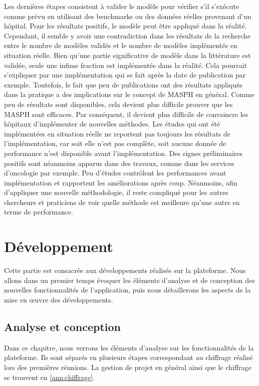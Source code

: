 \documentclass[noposter]{polytech/polytech}
\begin{document}
Les dernières étapes consistent à valider le modèle pour vérifier s'il s'exécute comme prévu en utilisant des benchmarks ou des données réelles provenant d'un hôpital. Pour les résultats positifs, le modèle peut être appliqué dans la réalité. Cependant, il semble y avoir une contradiction dans les résultats de la recherche entre le nombre de modèles validés et le nombre de modèles implémentés en situation réelle. Bien qu'une partie significative de modèle dans la littérature est validée, seule une infime fraction est implémentée dans la réalité. Cela pourrait s'expliquer par une implémentation qui se fait après la date de publication par exemple. Toutefois, le fait que peu de publications ont des résultats appliqués dans la pratique a des implications sur le concept de MASPH en général. Comme peu de résultats sont disponibles, cela devient plus difficile prouver que les MASPH sont efficaces. Par conséquent, il devient plus difficile de convaincre les hôpitaux d'implémenter de nouvelles méthodes. Les études qui ont été implémentées en situation réelle ne reportent pas toujours les résultats de l'implémentation, car soit elle n'est pas complète, soit aucune donnée de performance n'est disponible avant l'implémentation. Des signes préliminaires positifs sont néanmoins apparus dans des travaux, comme dans les services d'oncologie par exemple. Peu d'études contrôlent les performances avant implémentation et rapportent les améliorations après coup. Néanmoins, afin d'appliquer une nouvelle méthodologie, il reste compliqué pour les autres chercheurs et praticiens de voir quelle méthode est meilleure qu'une autre en terme de performance. 


\part{Développement}

Cette partie est consacrée aux développements réalisés sur la plateforme. Nous allons dans un premier temps évoquer les éléments d'analyse et de conception des nouvelles fonctionnalités de l'application, puis nous détaillerons les aspects de la mise en œuvre des développements. 


\chapter{Analyse et conception}


Dans ce chapitre, nous verrons les éléments d'analyse sur les fonctionnalités de la plateforme. Ils sont séparés en plusieurs étapes correspondant au chiffrage réalisé lors des premières réunions. La gestion de projet en général ainsi que le chiffrage se trouvent en \autoref{ann:chiffrage}.
\end{document}
